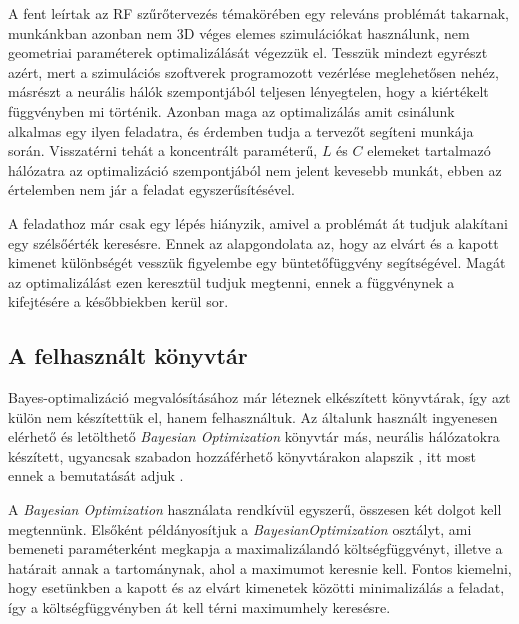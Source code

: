 		A fent leírtak az RF szűrőtervezés témakörében egy releváns problémát takarnak, munkánkban azonban nem 3D véges elemes szimulációkat használunk, nem geometriai paraméterek optimalizálását végezzük el. Tesszük mindezt egyrészt azért, mert a szimulációs szoftverek programozott vezérlése meglehetősen nehéz, másrészt a neurális hálók szempontjából teljesen lényegtelen, hogy a kiértékelt függvényben mi történik. Azonban maga az optimalizálás amit csinálunk alkalmas egy ilyen feladatra, és érdemben tudja a tervezőt segíteni munkája során. Visszatérni tehát a koncentrált paraméterű, $L$ és $C$ elemeket tartalmazó hálózatra az optimalizáció szempontjából nem jelent kevesebb munkát, ebben az értelemben nem jár a feladat egyszerűsítésével.
		
		A feladathoz már csak egy lépés hiányzik, amivel a problémát át tudjuk alakítani egy szélsőérték keresésre. Ennek az alapgondolata az, hogy az elvárt és a kapott kimenet különbségét vesszük figyelembe egy büntetőfüggvény segítségével. Magát az optimalizálást ezen keresztül tudjuk megtenni, ennek a függvénynek a kifejtésére a későbbiekben kerül sor.
		
	\subsection{A felhasznált könyvtár}
	
		Bayes-optimalizáció megvalósításához már léteznek elkészített könyvtárak, így azt külön nem készítettük el, hanem felhasználtuk. Az általunk használt ingyenesen elérhető és letölthető \textit{Bayesian Optimization} könyvtár más, neurális hálózatokra készített, ugyancsak szabadon hozzáférhető könyvtárakon alapszik \cite{scipy}, itt most ennek a bemutatását adjuk \cite{lancpar_spar}.
		
		A \textit{Bayesian Optimization} használata rendkívül egyszerű, összesen két dolgot kell megtennünk. Elsőként példányosítjuk a \textit{BayesianOptimization} osztályt, ami bemeneti paraméterként megkapja a maximalizálandó költségfüggvényt, illetve a határait annak a tartománynak, ahol a maximumot keresnie kell. Fontos kiemelni, hogy esetünkben a kapott és az elvárt kimenetek közötti minimalizálás a feladat, így a költségfüggvényben át kell térni maximumhely keresésre. 
		
